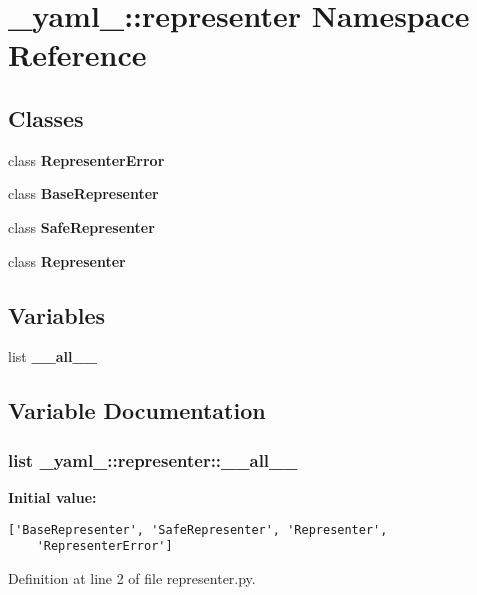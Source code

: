 \section{\_\-yaml\_\-::representer Namespace Reference}
\label{namespace__yaml___1_1representer}


\subsection*{Classes}
\begin{CompactItemize}
\item 
class {\bf RepresenterError}
\item 
class {\bf BaseRepresenter}
\item 
class {\bf SafeRepresenter}
\item 
class {\bf Representer}
\end{CompactItemize}
\subsection*{Variables}
\begin{CompactItemize}
\item 
list {\bf \_\-\_\-all\_\-\_\-}
\end{CompactItemize}


\subsection{Variable Documentation}
\subsubsection{\setlength{\rightskip}{0pt plus 5cm}list {\bf \_\-yaml\_\-::representer::\_\-\_\-all\_\-\_\-}\hspace{0.3cm}{\tt  [static]}}\label{namespace__yaml___1_1representer_5b2ac46fd55f7120d5cdc7f7534e5781}


\textbf{Initial value:}

\begin{Code}\begin{verbatim}['BaseRepresenter', 'SafeRepresenter', 'Representer',
    'RepresenterError']
\end{verbatim}
\end{Code}


Definition at line 2 of file representer.py.